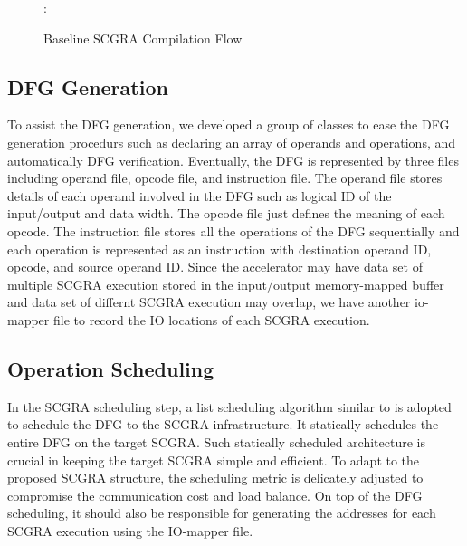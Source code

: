 \begin{figure}[H]
\caption{Baseline SCGRA Compilation Flow}
:\label{fig:base-scgra-compilation}
\end{figure}

\subsection{DFG Generation}
To assist the DFG generation, we developed a group of classes to ease the DFG generation procedurs such as declaring an array of operands and operations, and automatically DFG verification. Eventually, the DFG is represented by three files including operand file, opcode file, and instruction file. The operand file stores details of each operand involved in the DFG such as logical ID of the input/output and data width. The opcode file just defines the meaning of each opcode. The instruction file stores all the operations of the DFG sequentially and each operation is represented as an instruction with destination operand ID, opcode, and source operand ID. Since the accelerator may have data set of multiple SCGRA execution stored in the input/output memory-mapped buffer and data set of differnt SCGRA execution may overlap, we have another io-mapper file to record the IO locations of each SCGRA execution. 
       
\subsection{Operation Scheduling}
In the SCGRA scheduling step, a list scheduling algorithm similar to \cite{colinheart} is adopted to schedule the DFG to the SCGRA infrastructure. It statically schedules the entire DFG on the target SCGRA. Such statically scheduled architecture is crucial in keeping the target SCGRA simple and efficient. To adapt to the proposed SCGRA structure, the scheduling metric is delicately adjusted to compromise the communication cost and load balance. On top of the DFG scheduling, it should also be responsible for generating the addresses for each SCGRA execution using the IO-mapper file. 

